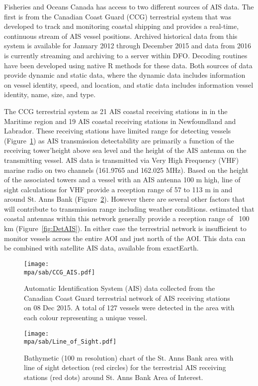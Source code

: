 \documentclass[letterpaper,portrait,11pt]{scrartcl}
\numberwithin{equation}{section}		%
\numberwithin{figure}{section}		%
\numberwithin{table}{section}				%
\newcommand*{\D}{.}
\newcommand{\biodata}{\string~/bio\D data}   %
\newcommand{\mpa}{\biodata/bio\D indicators/mpa}  %
\begin{document}
Fisheries and Oceans Canada has access to two different sources of AIS data.  The first is from the Canadian Coast Guard (CCG) terrestrial system that was developed to track and monitoring coastal shipping and provides a real-time, continuous stream of AIS vessel positions.  Archived historical data from this system is available for January 2012 through December 2015 and data from 2016 is currently streaming and archiving to a server within DFO. Decoding routines have been developed using native R methods for these data.   Both sources of data provide dynamic and static data, where the dynamic data includes information on vessel identity, speed, and location, and static data includes information vessel identity, name, size, and type.   

The CCG terrestrial system as 21 AIS coastal receiving stations in in the Maritime region and 19 AIS coastal receiving stations in Newfoundland and Labrador.  These receiving stations have limited range for detecting vessels (Figure~\ref{fig:TAIS}) as AIS transmission detectability are primarily a function of the receiving tower\textquoteright height above sea level and the height of the AIS antenna on the transmitting vessel.  AIS data is transmitted via Very High Frequency (VHF) marine radio on two channels (161.9765 and 162.025 MHz).  Based on the height of the associated towers and a vessel with an AIS antenna 100 m high, line of sight calculations for VHF provide a reception range of  57 to 113 m in and around St. Anns Bank (Figure~\ref{fig:LOF}).  However there are several other factors that will contribute to transmission range including weather conditions. \textcite{Simard2014shipping} estimated that coastal antennas within this network generally provide a reception range of ~100 km (Figure~\ref{fig:DetAIS}).  In either case the terrestrial network is insufficient to monitor vessels across the entire AOI and just north of the AOI. This data can be combined with satellite AIS data, available from exactEarth.


\begin{figure}[h]
  \centering
	\texttt{[image: \\mpa/sab/CCG\_AIS.pdf]}
	\caption{Automatic Identification System (AIS) data collected from the Canadian Coast Guard terrestrial network of AIS receiving stations on 08 Dec 2015. A total of 127 vessels were detected in the area with each colour representing a unique vessel.}
    \label{fig:TAIS}
\end{figure}


\begin{figure}[h]
	\centering
	\texttt{[image: \\mpa/sab/Line\_of\_Sight.pdf]}
	\caption{Bathymetic (100 m resolution) chart of the  St. Anns Bank area with line of sight detection (red circles) for the terrestrial AIS receiving stations (red dots) around St. Anns Bank Area of Interest.}
   \label{fig:LOF}
\end{figure}
\end{document}
